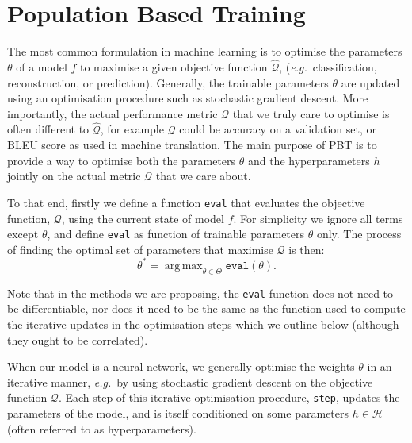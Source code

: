 \documentclass{article} %
\def\eg{\emph{e.g.}}
\def\mainobj{$\mathcal{Q}$}
\def\diffobj{$\hat{\mathcal{Q}}$}
\newcommand{\pbtstep}{\texttt{step}\xspace}
\newcommand{\pbteval}{\texttt{eval}\xspace}
\DeclareMathOperator*{\argmax}{arg\,max}
\newcommand{\thetam}{\theta}
\newcommand{\thetao}{h}
\begin{document}


\section{Population Based Training}\label{sec:pbt}

The most common formulation in machine learning is to optimise the parameters $\thetam$ of a model $f$ to maximise a given objective function \diffobj, (\eg~classification, reconstruction, or prediction). Generally, the trainable parameters $\thetam$ are updated using an optimisation procedure such as stochastic gradient descent.
%
More importantly, the actual performance metric \mainobj{} that we truly care to optimise is often different to \diffobj{}, for example \mainobj{} could be accuracy on a validation set, or BLEU score as used in machine translation. The main purpose of PBT is to provide a way to optimise both the parameters $\thetam$ and the hyperparameters $\thetao$ jointly on the actual metric \mainobj{} that we care about.

To that end, firstly we define a function \pbteval that evaluates the objective function, \mainobj{}, using the current state of model $f$. For simplicity we ignore all terms except $\thetam$, and define \pbteval as function of trainable parameters $\thetam$ only. The process of finding the optimal set of parameters that maximise \mainobj{} is then:
\begin{equation}
\theta^* = \argmax_{\theta \in \Theta} \mathtt{eval}(\theta).
\label{eqn:optimise}
\end{equation}

Note that in the methods we are proposing, the \pbteval function does not need to be differentiable, nor does it need to be the same as the function used to compute the iterative updates in the optimisation steps which we outline below (although they ought to be correlated).

When our model is a neural network, we generally optimise the weights $\thetam$ in an iterative manner, \eg~by using stochastic gradient descent on the objective function $\mathcal{Q}$. Each step of this iterative optimisation procedure, \pbtstep, updates the parameters of the model, and is itself conditioned on some parameters $\thetao \in \mathcal{H}$ (often referred to as hyperparameters). 
\end{document}
